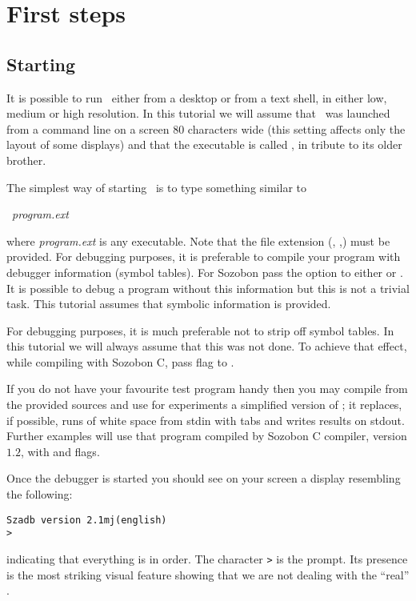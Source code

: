 \section{First steps}

\subsection{Starting}
It is possible to run \szadb\ either from a desktop or from a text shell, in
either low, medium or high resolution. In this tutorial we will assume that
\szadb\ was launched from a command line on a screen 80 characters wide (this
setting affects only the layout of some displays) and that the executable is
called \adb, in tribute to its older brother.

The simplest way of starting \szadb\ is to type something similar to
\begin{exmpl}
	\adb\ {\it program.ext}
\end{exmpl}
where {\it program.ext} is any executable.
Note that the file extension (, ,)
must be provided.
For debugging purposes, it is preferable to compile your
program with debugger information (symbol tables). For Sozobon pass the option
 to either  or .
It is possible to debug a program without this
information but this is not a trivial task. This tutorial assumes that symbolic
information is provided.

For debugging purposes, it is much preferable not to strip off symbol
tables.  In this tutorial we will always assume that this was not
done.
To achieve that effect, while compiling 
with Sozobon C, pass  flag to .

If you do not have your favourite test program handy then
you may compile from the provided sources
and use for experiments a simplified version of ;
it replaces, if possible, runs of white space 
from stdin with tabs and writes results on stdout.
Further examples will use that program compiled by Sozobon C compiler,
version $1.2$, with  and  flags.

Once the debugger is started you should see on your screen a display
resembling the following:
\begin{exmpl}
	{\tt Szadb version 2.1mj(english)}\\
	{\tt >} 
\end{exmpl}
indicating that everything is in order.
The character {\tt >} is the prompt.  Its presence is the most striking
visual feature showing that we are not dealing with the ``real''
.

